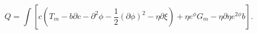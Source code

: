 \begin{equation*}
    Q=\int\left[c(T_m-b\partial
c-\partial^2\phi-\frac{1}{2}(\partial\phi)^2
    -\eta\partial\xi)+\eta
    e^{\phi}G_m-\eta\partial\eta
e^{2\phi}b\right].
\end{equation*}

